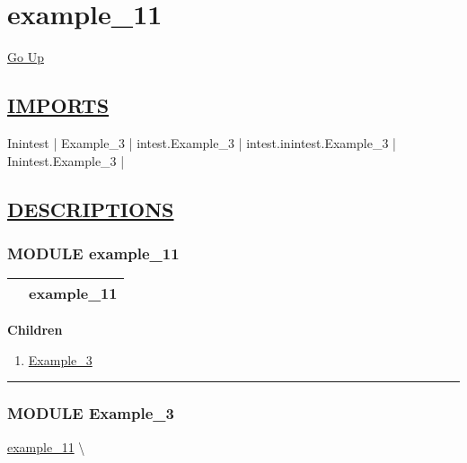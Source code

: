 \chapter*{\color{headfile}
example_11
}
\hypertarget{ecldoc:toc:example_11}{}
\hyperlink{ecldoc:toc:root}{Go Up}

\section*{\underline{\textsf{IMPORTS}}}
\begin{doublespace}
{\large
Inintest |
Example\_3 |
intest.Example\_3 |
intest.inintest.Example\_3 |
Inintest.Example\_3 |
}
\end{doublespace}

\section*{\underline{\textsf{DESCRIPTIONS}}}
\subsection*{\textsf{\colorbox{headtoc}{\color{white} MODULE}
example\_11}}

\hypertarget{ecldoc:example_11}{}

{\renewcommand{\arraystretch}{1.5}
\begin{tabularx}{\textwidth}{|>{\raggedright\arraybackslash}l|X|}
\hline
\hspace{0pt}\mytexttt{\color{red} } & \textbf{example\_11} \\
\hline
\end{tabularx}
}

\par


\textbf{Children}
\begin{enumerate}
\item \hyperlink{ecldoc:Inintest.Example_3}{Example\_3}
\end{enumerate}

\rule{\linewidth}{0.5pt}

\subsection*{\textsf{\colorbox{headtoc}{\color{white} MODULE}
Example\_3}}

\hypertarget{ecldoc:Inintest.Example_3}{}
\hspace{0pt} \hyperlink{ecldoc:example_11}{example_11} \textbackslash 

